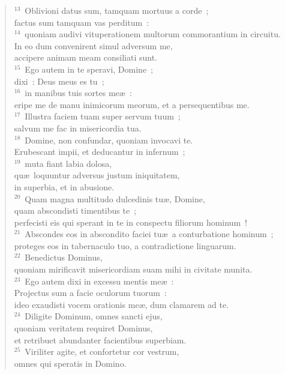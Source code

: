 \begin{flushleft}
\begin{verse}
${}^{13}$~Oblivioni datus sum, tamquam mortuus a corde~;\\ factus sum tamquam vas perditum~:\\
${}^{14}$~quoniam audivi vituperationem multorum commorantium in circuitu.\\ In eo dum convenirent simul adversum me,\\ accipere animam meam consiliati sunt.\\
${}^{15}$~Ego autem in te speravi, Domine~;\\ dixi~: Deus meus es tu~;\\
${}^{16}$~in manibus tuis sortes me\ae~:\\ eripe me de manu inimicorum meorum, et a persequentibus me.\\
${}^{17}$~Illustra faciem tuam super servum tuum~;\\ salvum me fac in misericordia tua.\\
${}^{18}$~Domine, non confundar, quoniam invocavi te.\\ Erubescant impii, et deducantur in infernum~;\\
${}^{19}$~muta fiant labia dolosa,\\ qu\ae\ loquuntur adversus justum iniquitatem,\\ in superbia, et in abusione.\\
${}^{20}$~Quam magna multitudo dulcedinis tu\ae , Domine,\\ quam abscondisti timentibus te~;\\ perfecisti eis qui sperant in te in conspectu filiorum hominum~!\\
${}^{21}$~Abscondes eos in abscondito faciei tu\ae\ a conturbatione hominum~;\\ proteges eos in tabernaculo tuo, a contradictione linguarum.\\
${}^{22}$~Benedictus Dominus,\\ quoniam mirificavit misericordiam suam mihi in civitate munita.\\
${}^{23}$~Ego autem dixi in excessu mentis me\ae~:\\ Projectus sum a facie oculorum tuorum~:\\ ideo exaudisti vocem orationis me\ae , dum clamarem ad te.\\
${}^{24}$~Diligite Dominum, omnes sancti ejus,\\ quoniam veritatem requiret Dominus,\\ et retribuet abundanter facientibus superbiam.\\
${}^{25}$~Viriliter agite, et confortetur cor vestrum,\\ omnes qui speratis in Domino.\end{verse}\end{flushleft}



